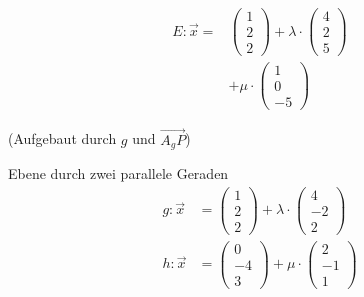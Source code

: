\documentclass[paper=a6,landscape,ngerman,twoside=true,fontsize=12pt]{scrartcl}
\begin{document}
\begin{antwort}
	\begin{align*}
	E:\vec{x}=&\left(\begin{array}{c} 1 \\ 2 \\ 2\end{array} \right)+\lambda \cdot \left(\begin{array}{c} 4 \\ 2 \\ 5\end{array} \right)\\
	&+\mu \cdot \left(\begin{array}{c} 1 \\0 \\ -5\end{array} \right)
	\end{align*}
	\begin{center}
	(Aufgebaut durch $g$ und $\vec{A_gP}$)
	\end{center}
\end{antwort}	
\begin{frage}
	\LARGE
	Ebene durch zwei parallele Geraden
	\large
	\begin{align*}
	g:\vec{x}&=\left(\begin{array}{c} 1 \\ 2 \\ 2\end{array} \right)+\lambda \cdot \left(\begin{array}{c} 4 \\ -2 \\ 2\end{array} \right)\\
	h:\vec{x}&=\left(\begin{array}{c} 0 \\ -4 \\ 3\end{array} \right)+\mu \cdot \left(\begin{array}{c} 2 \\ -1 \\ 1\end{array} \right)
	\end{align*}
\end{frage}
\end{document}
